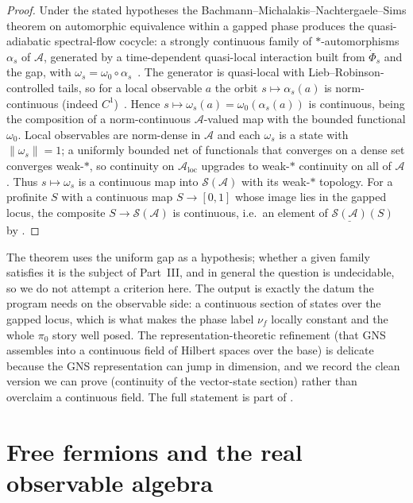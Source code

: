 \documentclass[12pt]{article}
\newcommand{\cond}[1]{\underline{#1}}          %
\newcommand{\qla}{\mathcal{A}}                  %
\newcommand{\loc}{\mathrm{loc}}                 %
\newcommand{\St}{\mathcal{S}}                   %
\newcommand{\norm}[1]{\lVert #1 \rVert}
\theoremstyle{plain}
\begin{document}
\begin{proof}
Under the stated hypotheses the Bachmann--Michalakis--Nachtergaele--Sims theorem on
automorphic equivalence within a gapped phase produces the quasi-adiabatic spectral-flow
cocycle: a strongly continuous family of $\ast$-automorphisms $\alpha_{s}$ of $\qla$,
generated by a time-dependent quasi-local interaction built from $\dot\Phi_{s}$ and
the gap, with $\omega_{s}=\omega_{0}\circ\alpha_{s}$~\cite{bmns-automorphic,hastings-wen-qac}.
The generator is quasi-local with Lieb--Robinson-controlled tails, so for a local
observable $a$ the orbit $s\mapsto\alpha_{s}(a)$ is norm-continuous (indeed
$C^{1}$)~\cite{nsy-quasilocality-1,paperLocality}. Hence
$s\mapsto\omega_{s}(a)=\omega_{0}(\alpha_{s}(a))$ is continuous, being the
composition of a norm-continuous $\qla$-valued map with the bounded functional
$\omega_{0}$. Local observables are norm-dense in $\qla$ and each $\omega_{s}$ is a
state with $\norm{\omega_{s}}=1$; a uniformly bounded net of functionals that
converges on a dense set converges weak-$\ast$, so continuity on $\qla_{\loc}$
upgrades to weak-$\ast$ continuity on all of $\qla$. Thus $s\mapsto\omega_{s}$ is a
continuous map into $\St(\qla)$ with its weak-$\ast$ topology. For a profinite
$S$ with a continuous map $S\to[0,1]$ whose image lies in the gapped locus, the
composite $S\to\St(\qla)$ is continuous, i.e.\ an element of $\cond{\St(\qla)}(S)$ by
.
\end{proof}

\begin{remark}
The theorem uses the uniform gap as a hypothesis; whether a given family satisfies it
is the subject of Part~III, and in general the question is undecidable, so we do not
attempt a criterion here. The output is exactly the datum the program needs on the
observable side: a continuous section of states over the gapped locus, which is what
makes the phase label $\nu_{f}$ locally constant and the whole $\pi_{0}$ story well
posed. The representation-theoretic refinement (that GNS assembles into a
continuous field of Hilbert spaces over the base) is delicate because the GNS
representation can jump in dimension, and we record the clean version we can prove
(continuity of the vector-state section) rather than overclaim a continuous field.
The full statement is part of .
\end{remark}

\section{Free fermions and the real observable algebra}
\label{sec:freefermion}
\end{document}
